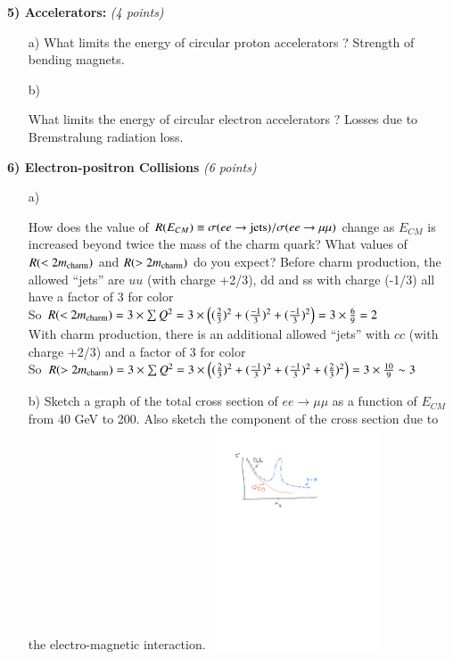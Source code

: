 {\vspace{0.5in}

\textbf{5) Accelerators: } \hfill \textit{(4 points)}\\
\begin{itemize}
\item[a)]{What limits the energy of circular proton accelerators ?
\bc
Strength of bending magnets.
\ec
}
\item[b)]{What limits the energy of circular electron accelerators ?
\bc
Losses due to Bremstralung radiation loss.
\ec

}
\end{itemize}

\clearpage

\textbf{6) Electron-positron Collisions } \hfill \textit{(6 points)}\\
\begin{itemize}
\item[a)]{
How does the value of $R(E_{CM}) \equiv \sigma(ee\rightarrow \textrm{jets})/\sigma(ee\rightarrow \mu\mu)$ change as $E_{CM}$ is increased beyond twice the mass of the charm quark? 
What values of $R(< 2 m_{\textrm{charm}})$ and $R(> 2 m_{\textrm{charm}})$ do you expect?
\bc
Before charm production,  the allowed ``jets'' are  $uu$ (with charge +2/3), dd and ss with charge (-1/3) all have a factor of 3 for color\\
So $R(< 2 m_{\textrm{charm}}) = 3\times \sum Q^2 = 3 \times \left( (\frac{2}{3})^2 + (\frac{-1}{3})^2  + (\frac{-1}{3})^2  \right) = 3 \times \frac{6}{9} = 2 $ \\
With charm production,  there is an additional allowed ``jets'' with  $cc$ (with charge +2/3) and a factor of 3 for color\\
So $R(> 2 m_{\textrm{charm}}) = 3\times \sum Q^2 = 3 \times \left( (\frac{2}{3})^2 + (\frac{-1}{3})^2  + (\frac{-1}{3})^2 + ( \frac{2}{3})^2 \right) = 3 \times \frac{10}{9} \sim 3 $ 

\ec
}

\item[b)]{Sketch a graph of the total cross section of $ee\rightarrow\mu\mu$ as a function of $E_{CM}$ from 40 GeV to 200. 
Also sketch the component of the cross section due to the electro-magnetic interaction.
\bc
\includegraphics[width=0.4\textwidth]{./ZPeak.pdf}
\ec
}
\end{itemize}

}
